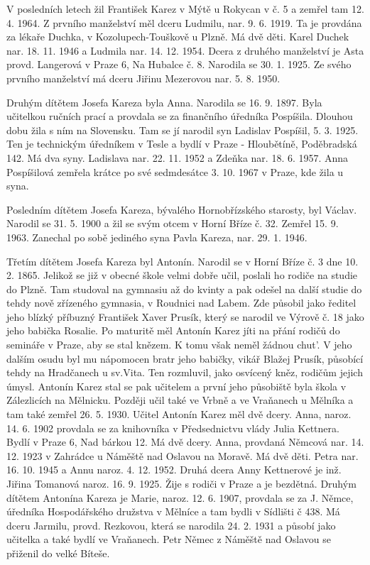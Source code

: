 \documentclass[../dejiny-rodu-prusiku.tex]{subfiles}
\begin{document}
V posledních letech žil František Karez v Mýtě u Rokycan v č. 5 a zemřel tam 12. 4. 1964. Z prvního manželství měl dceru Ludmilu, nar. 9. 6. 1919. Ta je provdána za lékaře Duchka, v Kozolupech-Touškově u Plzně. Má dvě děti. Karel Duchek nar. 18. 11. 1946 a Ludmila nar. 14. 12. 1954. Dcera z druhého manželství je Asta provd. Langerová v Praze 6, Na Hubalce č. 8. Narodila se 30. 1. 1925. Ze svého prvního manželství má dceru Jiřinu Mezerovou nar. 5. 8. 1950.

Druhým dítětem Josefa Kareza byla Anna. Narodila se 16. 9. 1897. Byla učitelkou ručních prací a provdala se za finančního úředníka Pospíšila. Dlouhou dobu žila s ním na Slovensku. Tam se jí narodil syn Ladislav Pospíšil, 5. 3. 1925. Ten je technickým úředníkem v Tesle a bydlí v Praze - Hloubětíně, Poděbradská 142. Má dva syny. Ladislava nar. 22. 11. 1952 a Zdeňka nar. 18. 6. 1957. Anna Pospí­šilová zemřela krátce po své sedmdesátce 3. 10. 1967 v Praze, kde žila u syna.

Posledním dítětem Josefa Kareza, bývalého Hornobřízského starosty, byl Václav. Narodil se 31. 5. 1900 a žil se svým otcem v Horní Bříze č. 32. Zemřel 15. 9. 1963. Za­nechal po sobě jediného syna Pavla Kareza, nar. 29. 1. 1946.

Třetím dítětem Josefa Kareza byl Antonín. Narodil se v Horní Bříze č. 3 dne 10. 2. 1865. Jelikož se již v obecné škole velmi dobře učil, poslali ho rodiče na studie do Plzně. Tam studoval na gymnasiu až do kvinty a pak odešel na další studie do tehdy nově zřízeného gymnasia, v Roudnici nad Labem. Zde působil jako ředitel jeho blíz­ký příbuzný František Xaver Prusík, který se narodil ve Výrově č. 18 jako jeho babička Rosalie. Po maturitě měl Antonín Karez jíti na přání rodičů do semináře v Praze, aby se stal knězem. K tomu však neměl žádnou chut'. V je­ho dalším osudu byl mu nápomocen bratr jeho babičky, vikář Blažej Prusík, působící tehdy na Hradčanech u sv.Vita. Ten rozmluvil, jako osvícený kněz, rodičům jejich úmysl. Antonín Karez stal se pak učitelem a první jeho působiště byla škola v Zálezlicích na Mělnicku. Později učil také ve Vrbně a ve Vraňanech u Mělníka a tam také zem­řel 26. 5. 1930. Učitel Antonín Karez měl dvě dcery. Anna, naroz. 14. 6. 1902 provdala se za knihovníka v Předsednictvu vlády Julia Kettnera. Bydlí v Praze 6, Nad bárkou 12. Má dvě dcery. Anna, provdaná Němcová nar. 14. 12. 1923 v Zahrádce u Náměště nad Oslavou na Moravě. Má dvě děti. Petra nar. 16. 10. 1945 a Annu naroz. 4. 12. 1952. Druhá dcera Anny Kettnerové je inž. Jiřina Tomanová naroz. 16. 9. 1925. Žije s rodiči v Praze a je bezdětná. Druhým dítětem Anto­nína Kareza je Marie, naroz. 12. 6. 1907, provdala se za J. Němce, úředníka Hospodářského družstva v Mělníce a tam bydli v Sídlišti č 438. Má dceru Jarmilu, provd. Rezkovou, kte­rá se narodila 24. 2. 1931 a působí jako učitelka a také bydlí ve Vraňanech. Petr Němec z Náměště nad Oslavou se přiženil do velké Bíteše.
\end{document}
